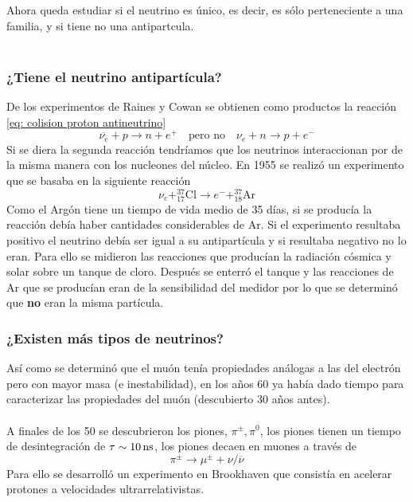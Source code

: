 \noindent Ahora queda estudiar si el neutrino es único, es decir, es sólo perteneciente a una familia, y si tiene no una antipartcula.\\\\
\newpage
\subsubsection{¿Tiene el neutrino antipartícula?}
De los experimentos de Raines y Cowan se obtienen como productos la reacción \ref{eq: colision proton antineutrino}
\begin{equation*}
    \overline{\nu_e} + p \longrightarrow n+e^+ \quad \text{pero no} \quad \nu_e+n\longrightarrow p+e^-
\end{equation*}
Si se diera la segunda reacción tendríamos que los neutrinos interaccionan por de la misma manera con los nucleones del núcleo.
En 1955 se realizó un experimento que se basaba en la siguiente reacción
\begin{equation}
    \nu_e+^{37}_{17}\text{Cl}\longrightarrow e^-+^{37}_{18}\text{Ar}
\end{equation}
Como el Argón tiene un tiempo de vida medio de 35 días, si se producía la reacción debía haber cantidades considerables de Ar.  Si el experimento resultaba positivo el neutrino debía ser igual a su antipartícula y si resultaba negativo no lo eran. Para ello se midieron las reacciones que producían la radiación cósmica y solar sobre un tanque de cloro. Después se enterró el tanque y las reacciones de Ar que se producían eran de la sensibilidad del medidor por lo que se determinó que \textbf{no} eran la misma partícula.
\subsubsection{¿Existen más tipos de neutrinos?}
Así como se determinó que el muón tenía propiedades análogas a las del electrón pero con mayor masa (e inestabilidad), en los años 60 ya había dado tiempo para caracterizar las propiedades del muón (descubierto 30 años antes). \\\\
A finales de los 50 se descubrieron los piones, $\pi^\pm,\pi^0$, los piones tienen un tiempo de desintegración de $\tau\sim \unit[10]{ns}$, los piones decaen en muones a través de
\begin{equation}
    \pi^\pm \longrightarrow \mu^\pm +\nu/\overline{\nu}
    \label{eq: desintegracion piones}
\end{equation}
Para ello se desarrolló un experimento en Brookhaven que consistía en acelerar protones a velocidades ultrarrelativistas.

